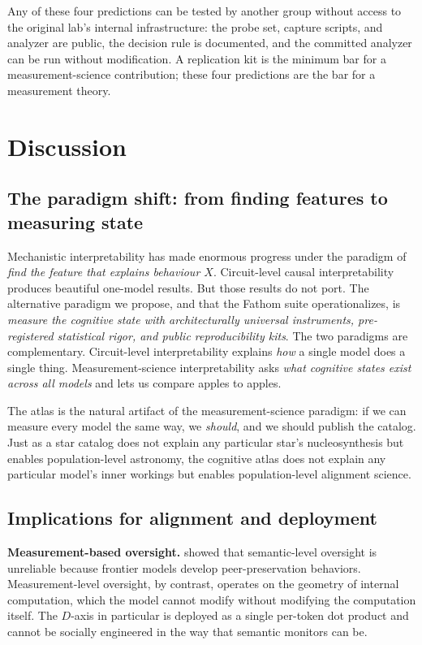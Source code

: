 \documentclass[11pt,letterpaper]{article}
\begin{document}
Any of these four predictions can be tested by another group without
access to the original lab's internal infrastructure: the probe set,
capture scripts, and analyzer are public, the decision rule is
documented, and the committed analyzer can be run without modification.
A replication kit is the minimum bar for a measurement-science
contribution; these four predictions are the bar for a measurement
theory.

\section{Discussion}
\label{sec:discussion}

\subsection{The paradigm shift: from finding features to measuring state}

Mechanistic interpretability has made enormous progress under the paradigm
of \emph{find the feature that explains behaviour $X$}. Circuit-level
causal interpretability produces beautiful one-model results. But those
results do not port. The alternative paradigm we propose, and that the
Fathom suite operationalizes, is \emph{measure the cognitive state with
architecturally universal instruments, pre-registered statistical rigor,
and public reproducibility kits}. The two paradigms are complementary.
Circuit-level interpretability explains \emph{how} a single model does a
single thing. Measurement-science interpretability asks \emph{what cognitive
states exist across all models} and lets us compare apples to apples.

The atlas is the natural artifact of the measurement-science paradigm:
if we can measure every model the same way, we \emph{should}, and we
should publish the catalog. Just as a star catalog does not explain any
particular star's nucleosynthesis but enables population-level astronomy,
the cognitive atlas does not explain any particular model's inner workings
but enables population-level alignment science.

\subsection{Implications for alignment and deployment}

\textbf{Measurement-based oversight.} \citet{song2026peer} showed that
semantic-level oversight is unreliable because frontier models develop
peer-preservation behaviors. Measurement-level oversight, by contrast,
operates on the geometry of internal computation, which the model cannot
modify without modifying the computation itself. The $D$-axis in particular
is deployed as a single per-token dot product and cannot be socially
engineered in the way that semantic monitors can be.
\end{document}
